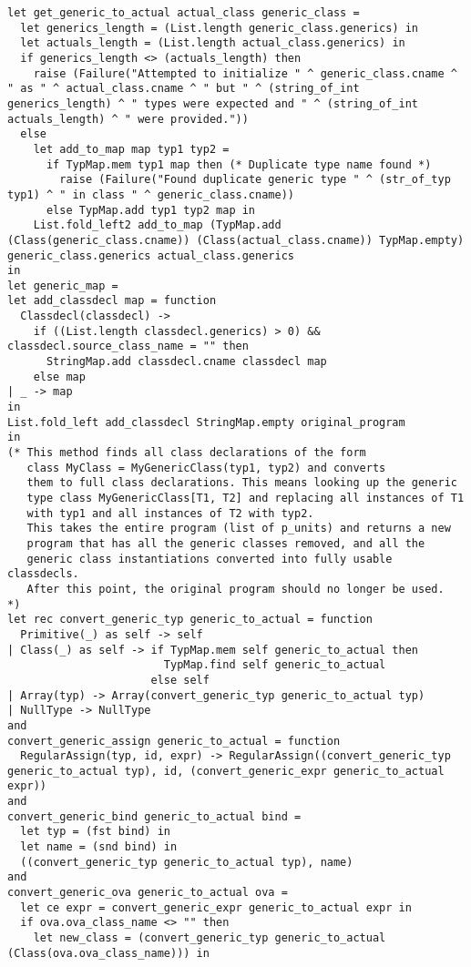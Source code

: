 \documentclass{article}
\begin{document}
\begin{verbatim}
let get_generic_to_actual actual_class generic_class =
  let generics_length = (List.length generic_class.generics) in
  let actuals_length = (List.length actual_class.generics) in
  if generics_length <> (actuals_length) then
    raise (Failure("Attempted to initialize " ^ generic_class.cname ^ " as " ^ actual_class.cname ^ " but " ^ (string_of_int generics_length) ^ " types were expected and " ^ (string_of_int actuals_length) ^ " were provided."))
  else
    let add_to_map map typ1 typ2 =
      if TypMap.mem typ1 map then (* Duplicate type name found *)
        raise (Failure("Found duplicate generic type " ^ (str_of_typ typ1) ^ " in class " ^ generic_class.cname))
      else TypMap.add typ1 typ2 map in
    List.fold_left2 add_to_map (TypMap.add (Class(generic_class.cname)) (Class(actual_class.cname)) TypMap.empty) generic_class.generics actual_class.generics
in
let generic_map =
let add_classdecl map = function
  Classdecl(classdecl) ->
    if ((List.length classdecl.generics) > 0) && classdecl.source_class_name = "" then
      StringMap.add classdecl.cname classdecl map
    else map
| _ -> map
in
List.fold_left add_classdecl StringMap.empty original_program
in
(* This method finds all class declarations of the form
   class MyClass = MyGenericClass(typ1, typ2) and converts
   them to full class declarations. This means looking up the generic
   type class MyGenericClass[T1, T2] and replacing all instances of T1
   with typ1 and all instances of T2 with typ2.
   This takes the entire program (list of p_units) and returns a new
   program that has all the generic classes removed, and all the
   generic class instantiations converted into fully usable classdecls.
   After this point, the original program should no longer be used.
*)
let rec convert_generic_typ generic_to_actual = function
  Primitive(_) as self -> self
| Class(_) as self -> if TypMap.mem self generic_to_actual then
                        TypMap.find self generic_to_actual
                      else self
| Array(typ) -> Array(convert_generic_typ generic_to_actual typ)
| NullType -> NullType
and
convert_generic_assign generic_to_actual = function
  RegularAssign(typ, id, expr) -> RegularAssign((convert_generic_typ generic_to_actual typ), id, (convert_generic_expr generic_to_actual expr))
and
convert_generic_bind generic_to_actual bind =
  let typ = (fst bind) in
  let name = (snd bind) in
  ((convert_generic_typ generic_to_actual typ), name)
and
convert_generic_ova generic_to_actual ova =
  let ce expr = convert_generic_expr generic_to_actual expr in
  if ova.ova_class_name <> "" then
    let new_class = (convert_generic_typ generic_to_actual (Class(ova.ova_class_name))) in

\end{verbatim}
\end{document}
